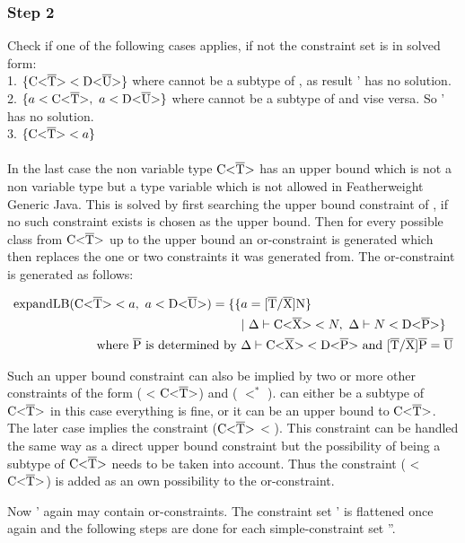 \subsubsection{Step 2}
Check if one of the following cases applies, if not the constraint set is in solved form:\\
1. $\{ \text{C<}\overline{\text{T}}\text{>} < \text{D<}\overline{\text{U}}\text{>} \}$ where  cannot be a subtype of , as result ' has no solution.\\
2. $\{ a < \text{C<}\overline{\text{T}}\text{>}, \ a < \text{D<}\overline{\text{U}}\text{>} \}$ where  cannot be a subtype of  and vise versa. So ' has no solution.\\
3. $\{ \text{C<}\overline{\text{T}}\text{>} < a \}$\\
\\
In the last case the non variable type $\text{C<}\overline{\text{T}}\text{>}$ has an upper bound which is not a non variable type but a type variable which is not allowed in Featherweight Generic Java.
This is solved by first searching the upper bound constraint of , if no such constraint exists  is chosen as the upper bound. Then for every possible class
from $\text{C<}\overline{\text{T}}\text{>}$ up to the upper bound an or-constraint is generated which then replaces the one or two constraints it was generated from.
The or-constraint is generated as follows:

\begin{align*}
    \text{expandLB} ( \text{C<}\overline{\text{T}}\text{>} < a, \ a < \text{D<}\overline{\text{U}}\text{>} ) = \{ \{ &a = \text{[}\overline{\text{T}}/\overline{\text{X}}\text{]N} \} \\
     &| \ \Delta \vdash \text{C<}\overline{\text{X}}\text{>} < N, \ \Delta \vdash N < \text{D<}\overline{\text{P}}\text{>} \}\\
    \text{where} \ \overline{\text{P}} \ \text{is determined by } & \Delta \vdash \text{C<}\overline{\text{X}}\text{>} < \text{D<}\overline{\text{P}}\text{>} \ \text{and} \ \text{[}\overline{\text{T}}/\overline{\text{X}}\text{]}\overline{\text{P}} = \overline{\text{U}}\\
\end{align*}

Such an upper bound constraint can also be implied by two or more other constraints of the form ( < $\text{C<}\overline{\text{T}}\text{>}$) and ( $<^*$ ).  can either be a subtype of $\text{C<}\overline{\text{T}}\text{>}$ in this case everything is fine, or it can be an upper bound to $\text{C<}\overline{\text{T}}\text{>}$.
The later case implies the constraint ($\text{C<}\overline{\text{T}}\text{>}$ < ). This constraint can be handled the same way as a direct upper bound constraint but the possibility of  being a subtype of $\text{C<}\overline{\text{T}}\text{>}$ needs to be taken into account. Thus the constraint ( < $\text{C<}\overline{\text{T}}\text{>}$) is added as an own possibility to the or-constraint.

Now ' again may contain or-constraints. The constraint set ' is flattened once again and the following steps are done for each simple-constraint set ''.

